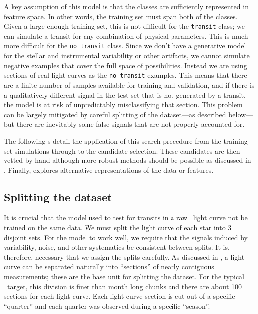A key assumption of this model is that the classes are sufficiently
represented in feature space.
In other words, the training set must span both of the classes.
Given a large enough training set, this is not difficult for the
\texttt{transit} class; we can simulate a transit for any combination of
physical parameters.
This is much more difficult for the \texttt{no transit} class.
Since we don't have a generative model for the stellar and instrumental
variability or other artifacts, we cannot simulate negative examples that
cover the full space of possibilities.
Instead we are using sections of real light curves as the \texttt{no transit}
examples.
This means that there are a finite number of samples available for training
and validation, and if there is a qualitatively different signal in the test
set that is not generated by a transit, the model is at risk of unpredictably
misclassifying that section.
This problem can be largely mitigated by careful splitting of the dataset---as
described below---but there are inevitably some false signals that are not
properly accounted for.

The following \sectionname s detail the application of this search procedure
from the training set simulations through to the candidate selection.
These candidates are then vetted by hand although more robust methods should
be possible as discussed in .
Finally,  explores alternative representations of the data or
features.


\subsection{Splitting the dataset}

It is crucial that the model used to test for transits in a raw \kepler\
light curve not be trained on the same data.
We must split the light curve of each star into 3 disjoint sets.
For the model to work well, we require that the signals induced by
variability, noise, and other systematics be consistent between splits.
It is, therefore, necessary that we assign the splits carefully.
As discussed in \sect{data}, a light curve can be separated naturally into
``sections'' of nearly contiguous measurements; these are the base unit for
splitting the dataset.
For the typical \kepler\ target, this division is finer than month long
chunks and there are about 100 sections for each light curve.
Each light curve section is cut out of a specific ``quarter'' and each quarter
was observed during a specific ``season''.

